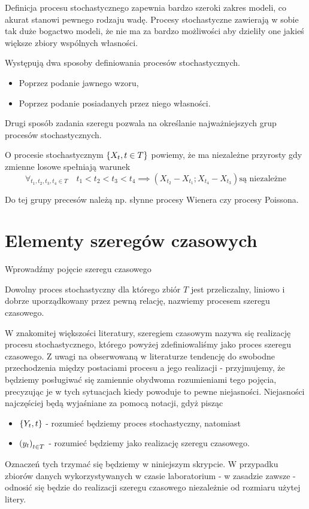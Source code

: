 \documentclass[10pt,a4paper]{book}
\begin{document}
Definicja procesu stochastycznego zapewnia bardzo szeroki zakres modeli, co akurat stanowi pewnego rodzaju wadę. Procesy stochastyczne zawierają w sobie tak duże bogactwo modeli, że nie ma za bardzo możliwości aby dzieliły one jakieś większe zbiory wspólnych własności. 

Występują dwa sposoby definiowania procesów stochastycznych. 
\begin{itemize}
\item Poprzez podanie jawnego wzoru,
\item Poprzez podanie posiadanych przez niego własności.
\end{itemize}

Drugi sposób zadania szeregu pozwala na określanie najważniejszych grup procesów stochastycznych.

\begin{definition}
O procesie stochastycznym $\left\lbrace {{X_t}, {t \in T}} \right\rbrace$ powiemy, że ma niezależne przyrosty gdy zmienne losowe spełniają warunek 
$$
\forall_{t_1,t_2,t_3,t_4 \in T} \quad t_1 < t_2 <t_3 < t_4 \implies ( X_{t_2} - X_{t_1} ; X_{t_4} - X_{t_3} ) \text{są niezależne}
$$
\end{definition}

Do tej grupy precesów należą np. słynne procesy Wienera czy procesy Poissona.

\section{Elementy szeregów czasowych}

Wprowadźmy pojęcie szeregu czasowego 

\begin{definition}
Dowolny proces stochastyczny dla którego zbiór $T$ jest przeliczalny, liniowo i dobrze uporządkowany przez pewną relację, nazwiemy procesem szeregu czasowego.
\end{definition}

\begin{remark}
W znakomitej większości literatury, szeregiem czasowym nazywa się realizację procesu stochastycznego, którego powyżej zdefiniowaliśmy jako proces szeregu czasowego. Z uwagi na obserwowaną w literaturze tendencję do swobodne przechodzenia między postaciami procesu a jego realizacji - przyjmujemy, że będziemy posługiwać się zamiennie obydwoma rozumieniami tego pojęcia, precyzując je w tych sytuacjach kiedy powoduje to pewne niejasności. Niejasności najczęściej będą wyjaśniane za pomocą notacji, gdyż pisząc
\begin{itemize}
\item $\left\lbrace {{Y_t}, {t}} \right\rbrace$ - rozumieć będziemy proces stochastyczny, natomiast
\item $\left( {y_t} \right)_{t \in T}^{}$ - rozumieć będziemy jako realizację szeregu czasowego.
\end{itemize}
Oznaczeń tych trzymać się będziemy w niniejszym skrypcie. W przypadku zbiorów danych wykorzystywanych w czasie laboratorium - w zasadzie zawsze - odnosić się będzie do realizacji szeregu czasowego niezależnie od rozmiaru użytej litery.
\end{remark}
\end{document}
